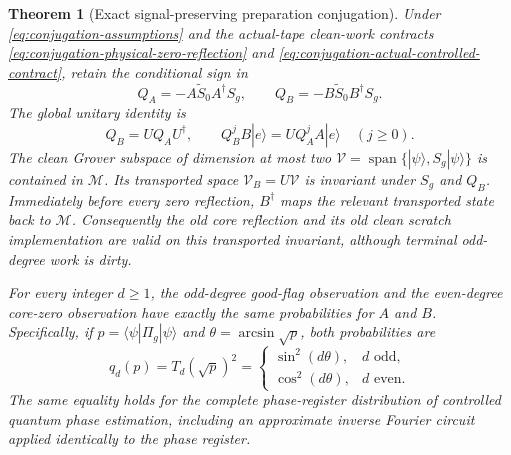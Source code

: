 \documentclass[11pt]{article}
\newtheorem{theorem}{Theorem}
\begin{document}
\begin{theorem}[Exact signal-preserving preparation conjugation]
\label{thm:exact-preparation-conjugation}
Under \eqref{eq:conjugation-assumptions} and the actual-tape clean-work
contracts \eqref{eq:conjugation-physical-zero-reflection} and
\eqref{eq:conjugation-actual-controlled-contract}, retain the
conditional sign in
\begin{equation}
 Q_A=-A\widetilde S_0 A^\dagger S_g,\qquad
 Q_B=-B\widetilde S_0 B^\dagger S_g.
 \label{eq:conjugation-iterates}
\end{equation}
The global unitary identity is
\begin{equation}
 Q_B=U Q_A U^\dagger,\qquad
 Q_B^j B|e\rangle=UQ_A^j A|e\rangle\quad(j\geq0).
 \label{eq:conjugation-global-identity}
\end{equation}
The clean Grover subspace of dimension at most two
$\mathcal V=\operatorname{span}\{|\psi\rangle,S_g|\psi\rangle\}$ is
contained in $\mathcal M$. Its transported space
$\mathcal V_B=U\mathcal V$ is invariant under $S_g$ and $Q_B$.
Immediately before every zero reflection, $B^\dagger$ maps the
relevant transported state back to $\mathcal M$. Consequently the old
core reflection and its old clean scratch implementation are valid on
this transported invariant, although terminal odd-degree work is dirty.

For every integer $d\geq1$, the odd-degree good-flag observation and
the even-degree core-zero observation have exactly the same
probabilities for $A$ and $B$. Specifically, if
$p=\langle\psi|\Pi_g|\psi\rangle$ and
$\theta=\arcsin\sqrt p$, both probabilities are
\begin{equation}
 q_d(p)=T_d(\sqrt p)^2
 =\begin{cases}
   \sin^2(d\theta),&d\text{ odd},\\
   \cos^2(d\theta),&d\text{ even}.
  \end{cases}
 \label{eq:conjugation-parity-signal}
\end{equation}
The same equality holds for the complete phase-register distribution
of controlled quantum phase estimation, including an approximate
inverse Fourier circuit applied identically to the phase register.
\end{theorem}
\end{document}

